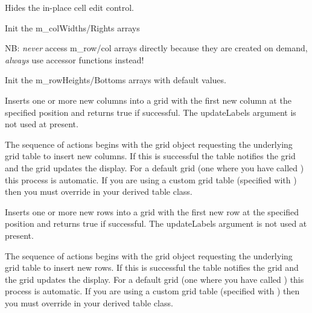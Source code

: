 
Hides the in-place cell edit control.



\label{wxgridinitcolwidths}


Init the m\_colWidths/Rights arrays



\label{wxgridinitrowheights}


NB: {\it never} access m\_row/col arrays directly because they are created
on demand, {\it always} use accessor functions instead!

Init the m\_rowHeights/Bottoms arrays with default values.



\label{wxgridinsertcols}


Inserts one or more new columns into a grid with the first new column at the
specified position and returns true if successful. The updateLabels argument is not
used at present.

The sequence of actions begins with the grid object requesting the underlying grid
table to insert new columns. If this is successful the table notifies the grid and the
grid updates the display. For a default grid (one where you have called
) this process is automatic. If you are
using a custom grid table (specified with )
then you must override
 in your derived
table class.



\label{wxgridinsertrows}


Inserts one or more new rows into a grid with the first new row at the specified
position and returns true if successful. The updateLabels argument is not used at
present.

The sequence of actions begins with the grid object requesting the underlying grid
table to insert new rows. If this is successful the table notifies the grid and the
grid updates the display. For a default grid (one where you have called
) this process is automatic. If you are
using a custom grid table (specified with )
then you must override
 in your derived
table class.




